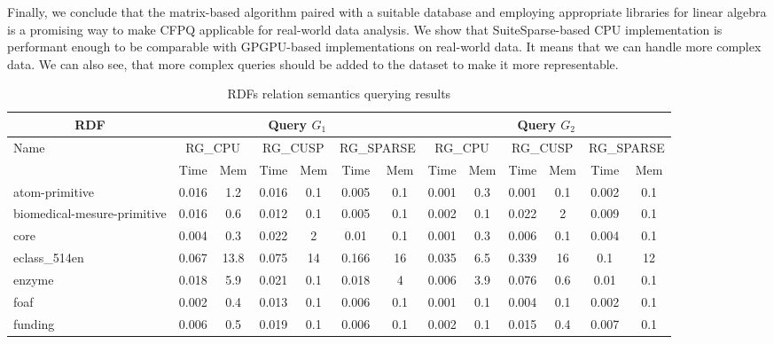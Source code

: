 Finally, we conclude that the matrix-based algorithm paired with a suitable database and employing appropriate libraries for linear algebra is a promising way to make CFPQ applicable for real-world data analysis.
We show that SuiteSparse-based CPU implementation is performant enough to be comparable with GPGPU-based implementations on real-world data.
It means that we can handle more complex data.
We can also see, that more complex queries should be added to the dataset to make it more representable.


{\setlength{\tabcolsep}{0.4em}
\begin{table*}[h]
\caption{RDFs relation semantics querying results}
\label{tbl:tableRDFRelationalPathIndex}
\begin{tabular}{| l | c  c | c  c | c  c | c  c | c  c | c  c |}
    \hline
    \multicolumn{1}{|c|}{RDF}	&	\multicolumn{6}{|c|}{Query $G_1$}	&	\multicolumn{6}{|c|}{Query $G_2$} \\
    \hline
    \multirow{2}{*}{Name}	&	\multicolumn{2}{|c|}{RG\_CPU}	&	\multicolumn{2}{|c|}{RG\_CUSP}	&	\multicolumn{2}{|c|}{RG\_SPARSE}	&	\multicolumn{2}{|c|}{RG\_CPU}	&	\multicolumn{2}{|c|}{RG\_CUSP}	&	\multicolumn{2}{|c|}{RG\_SPARSE} \\
    		& Time & Mem &  Time     & Mem & Time     & Mem & Time     & Mem & Time     & Mem &  Time     & Mem \\    
    \hline
    \hline
    atom-primitive              & 0.016 & 1.2  & 0.016 & 0.1 & 0.005 & 0.1   & 0.001 & 0.3  & 0.001 & 0.1 & 0.002 & 0.1   \\
biomedical-mesure-primitive & 0.016 & 0.6  & 0.012 & 0.1 & 0.005 & 0.1   & 0.002 & 0.1  & 0.022 & 2   & 0.009 & 0.1   \\
core                        & 0.004 & 0.3  & 0.022 & 2   & 0.01  & 0.1   & 0.001 & 0.3  & 0.006 & 0.1 & 0.004 & 0.1   \\
eclass\_514en                 & 0.067 & 13.8 & 0.075 & 14  & 0.166 & 16    & 0.035 & 6.5  & 0.339 & 16  & 0.1   & 12    \\
enzyme                      & 0.018 & 5.9  & 0.021 & 0.1 & 0.018 & 4     & 0.006 & 3.9  & 0.076 & 0.6 & 0.01  & 0.1   \\
foaf                        & 0.002 & 0.4  & 0.013 & 0.1 & 0.006 & 0.1   & 0.001 & 0.1  & 0.004 & 0.1 & 0.002 & 0.1   \\
funding                     & 0.006 & 0.5  & 0.019 & 0.1 & 0.006 & 0.1   & 0.002 & 0.1  & 0.015 & 0.4 & 0.007 & 0.1   \\

\end{tabular}
\end{table*}}
